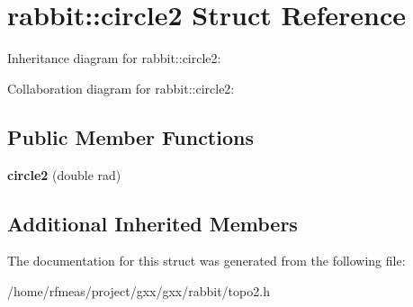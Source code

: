 \hypertarget{structrabbit_1_1circle2}{}\section{rabbit\+:\+:circle2 Struct Reference}
\label{structrabbit_1_1circle2}


Inheritance diagram for rabbit\+:\+:circle2\+:


Collaboration diagram for rabbit\+:\+:circle2\+:
\subsection*{Public Member Functions}
\begin{DoxyCompactItemize}
\item 
{\bfseries circle2} (double rad)\hypertarget{structrabbit_1_1circle2_a79dc420bd96a245af5f214d833f50f87}{}\label{structrabbit_1_1circle2_a79dc420bd96a245af5f214d833f50f87}

\end{DoxyCompactItemize}
\subsection*{Additional Inherited Members}


The documentation for this struct was generated from the following file\+:\begin{DoxyCompactItemize}
\item 
/home/rfmeas/project/gxx/gxx/rabbit/topo2.\+h\end{DoxyCompactItemize}
